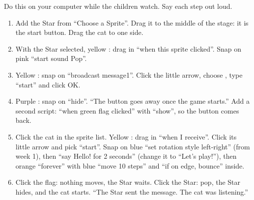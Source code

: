 \begin{workedexample}
Do this on your computer while the children watch. Say each step out loud.
\begin{enumerate}[leftmargin=1.4em,itemsep=1pt]
  \item Add the Star from \enquote{Choose a Sprite}. Drag it to the middle of the stage: it is the start button. Drag the cat to one side.
  \item With the Star selected, yellow : drag in \enquote{when this sprite clicked}. Snap on pink  \enquote{start sound Pop}.
  \item Yellow : snap on \enquote{broadcast message1}. Click the little arrow, choose , type \enquote{start} and click OK.
  \item Purple : snap on \enquote{hide}. \enquote{The button goes away once the game starts.} Add a second script: \enquote{when green flag clicked} with \enquote{show}, so the button comes back.
  \item Click the cat in the sprite list. Yellow : drag in \enquote{when I receive}. Click its little arrow and pick \enquote{start}. Snap on blue  \enquote{set rotation style left-right} (from week 1), then \enquote{say Hello! for 2 seconds} (change it to \enquote{Let's play!}), then orange  \enquote{forever} with blue  \enquote{move 10 steps} and \enquote{if on edge, bounce} inside.
  \item Click the flag: nothing moves, the Star waits. Click the Star: pop, the Star hides, and the cat starts. \enquote{The Star sent the message. The cat was listening.}
\end{enumerate}
\begin{center}
\begin{scratch}[scale=0.85]
\end{scratch}
\quad
\begin{scratch}[scale=0.85]
\end{scratch}
\end{center}
\end{workedexample}

